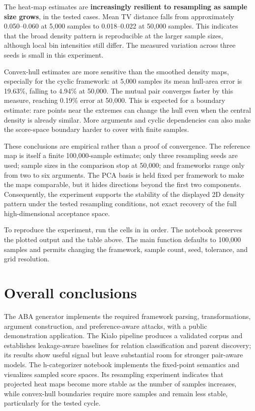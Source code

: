 \documentclass[11pt,a4paper]{article}
\newcommand{\code}[1]{\texttt{\detokenize{#1}}}
\begin{document}
The heat-map estimates are \textbf{increasingly resilient to resampling as sample size grows}, in the tested cases. Mean TV distance falls from approximately 0.050--0.060 at 5,000 samples to 0.018--0.022 at 50,000 samples. This indicates that the broad density pattern is reproducible at the larger sample sizes, although local bin intensities still differ. The measured variation across three seeds is small in this experiment.

Convex-hull estimates are more sensitive than the smoothed density maps, especially for the cyclic framework: at 5,000 samples its mean hull-area error is 19.63\%, falling to 4.94\% at 50,000. The mutual pair converges faster by this measure, reaching 0.19\% error at 50,000. This is expected for a boundary estimate: rare points near the extremes can change the hull even when the central density is already similar. More arguments and cyclic dependencies can also make the score-space boundary harder to cover with finite samples.

These conclusions are empirical rather than a proof of convergence. The reference map is itself a finite 100,000-sample estimate; only three resampling seeds are used; sample sizes in the comparison stop at 50,000; and frameworks range only from two to six arguments. The PCA basis is held fixed per framework to make the maps comparable, but it hides directions beyond the first two components. Consequently, the experiment supports the stability of the displayed 2D density pattern under the tested resampling conditions, not exact recovery of the full high-dimensional acceptance space.

To reproduce the experiment, run the cells in \code{part3.ipynb} in order. The notebook preserves the plotted output and the table above. The main function defaults to 100,000 samples and permits changing the framework, sample count, seed, tolerance, and grid resolution.

\section{Overall conclusions}

The ABA generator implements the required framework parsing, transformations, argument construction, and preference-aware attacks, with a public demonstration application. The Kialo pipeline produces a validated corpus and establishes leakage-aware baselines for relation classification and parent discovery; its results show useful signal but leave substantial room for stronger pair-aware models. The h-categorizer notebook implements the fixed-point semantics and visualizes sampled score spaces. Its resampling experiment indicates that projected heat maps become more stable as the number of samples increases, while convex-hull boundaries require more samples and remain less stable, particularly for the tested cycle.
\end{document}
